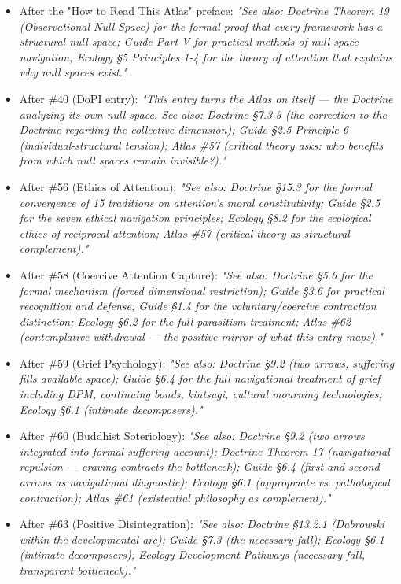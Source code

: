 \begin{itemize}[nosep,leftmargin=*]
  \item After the "How to Read This Atlas" preface: \textit{"See also: Doctrine Theorem 19 (Observational Null Space) for the formal proof that every framework has a structural null space; Guide Part V for practical methods of null-space navigation; Ecology §5 Principles 1-4 for the theory of attention that explains why null spaces exist."}
  \item After \#40 (DoPI entry): \textit{"This entry turns the Atlas on itself — the Doctrine analyzing its own null space. See also: Doctrine §7.3.3 (the correction to the Doctrine regarding the collective dimension); Guide §2.5 Principle 6 (individual-structural tension); Atlas \#57 (critical theory asks: who benefits from which null spaces remain invisible?)."}
  \item After \#56 (Ethics of Attention): \textit{"See also: Doctrine §15.3 for the formal convergence of 15 traditions on attention's moral constitutivity; Guide §2.5 for the seven ethical navigation principles; Ecology §8.2 for the ecological ethics of reciprocal attention; Atlas \#57 (critical theory as structural complement)."}
  \item After \#58 (Coercive Attention Capture): \textit{"See also: Doctrine §5.6 for the formal mechanism (forced dimensional restriction); Guide §3.6 for practical recognition and defense; Guide §1.4 for the voluntary/coercive contraction distinction; Ecology §6.2 for the full parasitism treatment; Atlas \#62 (contemplative withdrawal — the positive mirror of what this entry maps)."}
  \item After \#59 (Grief Psychology): \textit{"See also: Doctrine §9.2 (two arrows, suffering fills available space); Guide §6.4 for the full navigational treatment of grief including DPM, continuing bonds, kintsugi, cultural mourning technologies; Ecology §6.1 (intimate decomposers)."}
  \item After \#60 (Buddhist Soteriology): \textit{"See also: Doctrine §9.2 (two arrows integrated into formal suffering account); Doctrine Theorem 17 (navigational repulsion — craving contracts the bottleneck); Guide §6.4 (first and second arrows as navigational diagnostic); Ecology §6.1 (appropriate vs. pathological contraction); Atlas \#61 (existential philosophy as complement)."}
  \item After \#63 (Positive Disintegration): \textit{"See also: Doctrine §13.2.1 (Dabrowski within the developmental arc); Guide §7.3 (the necessary fall); Ecology §6.1 (intimate decomposers); Ecology Development Pathways (necessary fall, transparent bottleneck)."}

\end{itemize}
